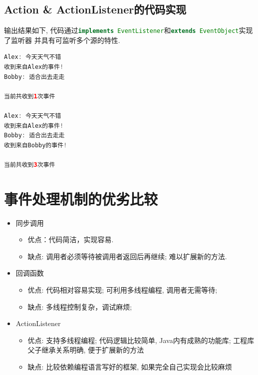 \documentclass[12pt, a4paper, oneside]{ctexart}
\begin{document}
\subsection{Action \& ActionListener的代码实现}

    
    输出结果如下, 代码通过\lstinline[language = Java]{implements EventListener}和\lstinline[language = Java]{extends EventObject}实现了监听器
    并具有可监听多个源的特性.
    \begin{lstlisting}[language = Java]
Alex: 今天天气不错
收到来自Alex的事件!
Bobby: 适合出去走走

当前共收到1次事件

Alex: 今天天气不错
收到来自Alex的事件!
Bobby: 适合出去走走
收到来自Bobby的事件!

当前共收到3次事件
    \end{lstlisting}


\section{事件处理机制的优劣比较}

\begin{itemize}
    \item 同步调用
    \begin{itemize}
        \item 优点：代码简洁，实现容易.
        \item 缺点: 调用者必须等待被调用者返回后再继续; 难以扩展新的方法.
    \end{itemize}
    \item 回调函数
    \begin{itemize}
        \item 优点: 代码相对容易实现; 可利用多线程编程, 调用者无需等待; 
        \item 缺点: 多线程控制复杂，调试麻烦; 
    \end{itemize}
    \item ActionListener
    \begin{itemize}
        \item 优点: 支持多线程编程; 代码逻辑比较简单, Java内有成熟的功能库; 工程库父子继承关系明确, 便于扩展新的方法
        \item 缺点: 比较依赖编程语言写好的框架, 如果完全自己实现会比较麻烦
    \end{itemize}
\end{itemize}
\end{document}
